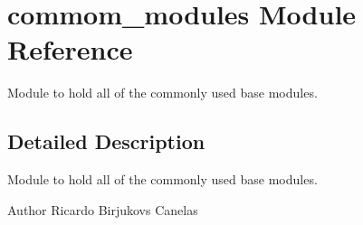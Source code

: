 \hypertarget{namespacecommom__modules}{}\section{commom\+\_\+modules Module Reference}
\label{namespacecommom__modules}


Module to hold all of the commonly used base modules.  




\subsection{Detailed Description}
Module to hold all of the commonly used base modules. 

\begin{DoxyAuthor}{Author}
Ricardo Birjukovs Canelas 
\end{DoxyAuthor}
